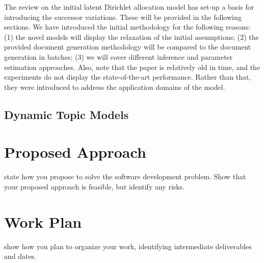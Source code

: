 \documentclass{mprop}
\begin{document}
\par The review on the initial latent Dirichlet allocation model has set-up a basis for introducing the successor variations. These will be provided in the following sections. We have introduced the initial methodology for the following reasons: (1) the novel models will display the relaxation of the initial assumptions; (2) the provided document generation methodology will be compared to the document generation in batches; (3) we will cover different inference and parameter estimation approaches. Also, note that the paper is relatively old in time, and the experiments do not display the state-of-the-art performance. Rather than that, they were introduced to address the application domains of the model. 

\subsection{Dynamic Topic Models}

\par

\par

\par

\par

\par

\par






\section{Proposed Approach}

state how you propose to solve the software development problem. Show that your proposed approach is feasible, but identify any risks.

\section{Work Plan}

show how you plan to organize your work, identifying intermediate deliverables and dates.



\end{document}
